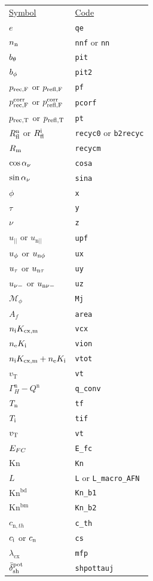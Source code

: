 \begin{tabular}{L{3cm} L{8cm}}
\underline{Symbol} & \underline{Code} \\
$e$ & \texttt{qe} \\
$n_{\mathrm{n}}$ & \texttt{nnf} or \texttt{nn} \\
$b_{\theta}$ & \texttt{pit} \\
$b_{\phi}$ & \texttt{pit2} \\
$p_{\mathrm{rec,F}}$ or $p_{\mathrm{refl,F}}$ &  \texttt{pf}\\
$p_{\mathrm{rec,F}}^{\mathrm{corr}}$ or $p_{\mathrm{refl,F}}^{\mathrm{corr}}$ &  \texttt{pcorf}\\
$p_{\mathrm{rec,T}}$ or $p_{\mathrm{refl,T}} $ &  \texttt{pt}\\
$R^{\mathrm{n}}_\mathrm{fl}$ or $R^{\mathrm{i}}_\mathrm{fl}$ &  \texttt{recyc0} or \texttt{b2recyc} \\
$R_{\mathrm{m}}$ & \texttt{recycm}\\
$\cos \alpha_{\nu}$ & \texttt{cosa} \\
$\sin \alpha_{\nu}$ & \texttt{sina} \\
$\phi$ & \texttt{x} \\
$\tau$ & \texttt{y} \\
$\nu$ & \texttt{z} \\
$u_{||}$ or $u_{\mathrm{n}||}$ & \texttt{upf} \\
$ u_\phi $ or $ u_{\mathrm{n} \phi} $ & \texttt{ux} \\
$ u_\tau $ or $ u_{\mathrm{n} \tau}$ & \texttt{uy} \\
$ u_{\nu-} $ or $ u_{\mathrm{n}\nu-} $ & \texttt{uz} \\
$\mathcal{M}_\phi$ & \texttt{Mj}\\
$A_f$ & \texttt{area} \\
$n_\mathrm{i} K_\mathrm{cx,m}$ & \texttt{vcx} \\
$n_\mathrm{e} K_\mathrm{i}$ & \texttt{vion} \\
$n_\mathrm{i} K_\mathrm{cx,m} + n_\mathrm{e} K_\mathrm{i}$ & \texttt{vtot} \\
$v_{\mathrm{T}}$ & \texttt{vt}\\
$\Gamma^{\mathrm{n}}_H - Q^{\mathrm{n}}$ & \texttt{q\_conv}\\
$T_{\mathrm{n}}$ & \texttt{tf}\\
$T_{\mathrm{i}}$ & \texttt{tif}\\
$v_{\mathrm{T}}$ & \texttt{vt}\\
$E_{FC}$ & \texttt{E\_fc}\\
$\mathrm{Kn}$ & \texttt{Kn} \\
$L$ & \texttt{L} or \texttt{L\_macro\_AFN}  \\
$\mathrm{Kn^{bd}}$ & \texttt{Kn\_b1} \\
$\mathrm{Kn^{bm}}$ & \texttt{Kn\_b2} \\
$c_{\mathrm{n},th}$ & \texttt{c\_th} \\
$c_{\mathrm{i}} $ or $ c_{\mathrm{n}} $ & \texttt{cs} \\
$\lambda_{\mathrm{cx}}$ & \texttt{mfp} \\
$\bar{\delta}_{\mathrm{sh}}^{\mathrm{pot}}$ & \texttt{shpottauj}
\end{tabular}


